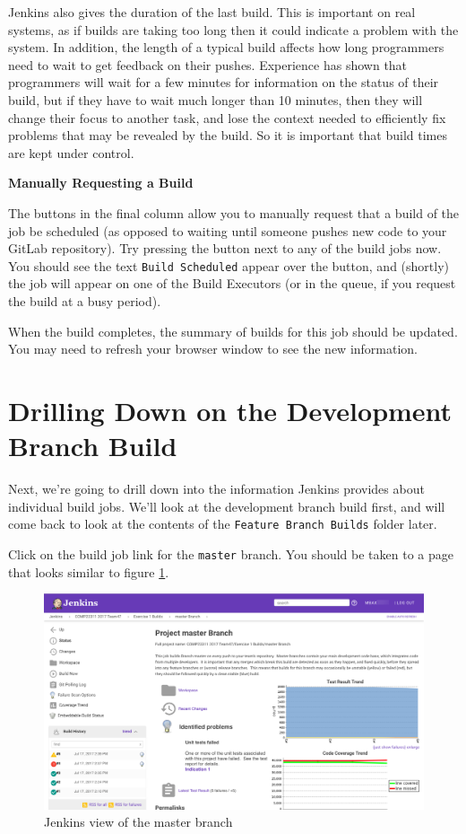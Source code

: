 \documentclass[
]{book}
\begin{document}
Jenkins also gives the duration of the last build. This is important on real systems, as if builds are taking too long then it could indicate a problem with the system. In addition, the length of a typical build affects how long programmers need to wait to get feedback on their pushes. Experience has shown that programmers will wait for a few minutes for information on the status of their build, but if they have to wait much longer than 10 minutes, then they will change their focus to another task, and lose the context needed to efficiently fix problems that may be revealed by the build. So it is important that build times are kept under control.

\textbf{Manually Requesting a Build}

The buttons in the final column allow you to manually request that a build of the job be scheduled (as opposed to waiting until someone pushes new code to your GitLab repository). Try pressing the button next to any of the build jobs now. You should see the text \texttt{Build\ Scheduled} appear over the button, and (shortly) the job will appear on one of the Build Executors (or in the queue, if you request the build at a busy period).

When the build completes, the summary of builds for this job should be updated. You may need to refresh your browser window to see the new information.

\hypertarget{drilling}{%
\section{Drilling Down on the Development Branch Build}\label{drilling}}

Next, we're going to drill down into the information Jenkins provides about individual build jobs. We'll look at the development branch build first, and will come back to look at the contents of the \texttt{Feature\ Branch\ Builds} folder later.

Click on the build job link for the \texttt{master} branch. You should be taken to a page that looks similar to figure \ref{fig:master-branch-fig}.

\begin{figure}

{\centering \includegraphics[width=1\linewidth]{images/master-branch} 

}

\caption{Jenkins view of the master branch}\label{fig:master-branch-fig}
\end{figure}
\end{document}
